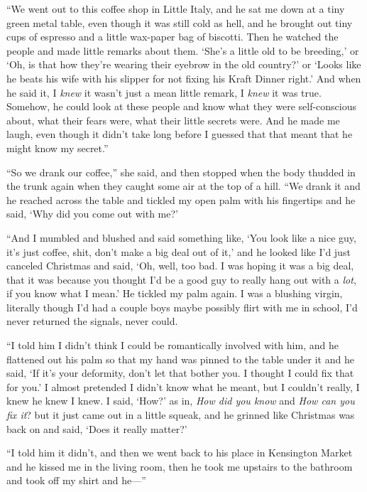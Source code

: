 \documentclass{article}
\begin{document}
``We went out to this coffee shop in Little Italy, and he sat me down
at a tiny green metal table, even though it was still cold as hell,
and he brought out tiny cups of espresso and a little wax-paper bag of
biscotti.  Then he watched the people and made little remarks about
them.  `She's a little old to be breeding,' or `Oh, is that how
they're wearing their eyebrow in the old country?' or `Looks like he
beats his wife with his slipper for not fixing his Kraft Dinner
right.' And when he said it, I \textit{knew} it wasn't just a mean
little remark, I \textit{knew} it was true.  Somehow, he could look at
these people and know what they were self-conscious about, what their
fears were, what their little secrets were.  And he made me laugh,
even though it didn't take long before I guessed that that meant that
he might know my secret.''

``So we drank our coffee,'' she said, and then stopped when the body
thudded in the trunk again when they caught some air at the top of a
hill.  ``We drank it and he reached across the table and tickled my
open palm with his fingertips and he said, `Why did you come out with
me?'

``And I mumbled and blushed and said something like, `You look like a
nice guy, it's just coffee, shit, don't make a big deal out of it,'
and he looked like I'd just canceled Christmas and said, `Oh, well,
too bad.  I was hoping it was a big deal, that it was because you
thought I'd be a good guy to really hang out with a \textit{lot}, if
you know what I mean.' He tickled my palm again.  I was a blushing
virgin, literally though I'd had a couple boys maybe possibly flirt
with me in school, I'd never returned the signals, never could.

``I told him I didn't think I could be romantically involved with him,
and he flattened out his palm so that my hand was pinned to the table
under it and he said, `If it's your deformity, don't let that bother
you.  I thought I could fix that for you.' I almost pretended I didn't
know what he meant, but I couldn't really, I knew he knew I knew.  I
said, `How?' as in, \textit{How did you know} and \textit{How can you
fix it}?  but it just came out in a little squeak, and he grinned like
Christmas was back on and said, `Does it really matter?'

``I told him it didn't, and then we went back to his place in
Kensington Market and he kissed me in the living room, then he took me
upstairs to the bathroom and took off my shirt and he---''
\end{document}
